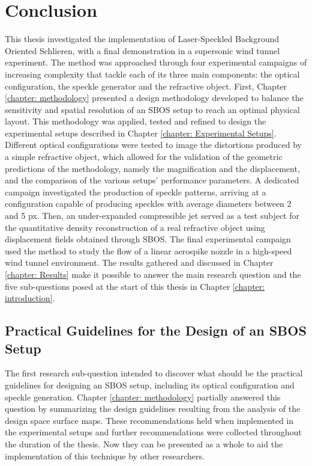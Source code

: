 \chapter{Conclusion}
\label{chapter: Conclusion}

This thesis investigated the implementation of Laser-Speckled Background Oriented Schlieren, with a final demonstration in a supersonic wind tunnel experiment. The method was approached through four experimental campaigns of increasing complexity that tackle each of its three main components: the optical configuration, the speckle generator and the refractive object. First, Chapter \ref{chapter: methodology} presented a design methodology developed to balance the sensitivity and spatial resolution of an SBOS setup to reach an optimal physical layout. This methodology was applied, tested and refined to design the experimental setups described in Chapter \ref{chapter: Experimental Setups}. Different optical configurations were tested to image the distortions produced by a simple refractive object, which allowed for the validation of the geometric predictions of the methodology, namely the magnification and the displacement, and the comparison of the various setups' performance parameters. A dedicated campaign investigated the production of speckle patterns, arriving at a configuration capable of producing speckles with average diameters between 2 and 5 px. Then, an under-expanded compressible jet served as a test subject for the quantitative density reconstruction of a real refractive object using displacement fields obtained through SBOS. The final experimental campaign used the method to study the flow of a linear aerospike nozzle in a high-speed wind tunnel environment. The results gathered and discussed in Chapter \ref{chapter: Results} make it possible to answer the main research question and the five sub-questions posed at the start of this thesis in Chapter \ref{chapter: introduction}.

\section{Practical Guidelines for the Design of an SBOS Setup}
\label{section: practical Guidelines for the Design of SBOS}

The first research sub-question intended to discover what should be the practical guidelines for designing an SBOS setup, including its optical configuration and speckle generation. Chapter \ref{chapter: methodology} partially answered this question by summarizing the design guidelines resulting from the analysis of the design space surface maps. These recommendations held when implemented in the experimental setups and further recommendations were collected throughout the duration of the thesis. Now they can be presented as a whole to aid the implementation of this technique by other researchers.

